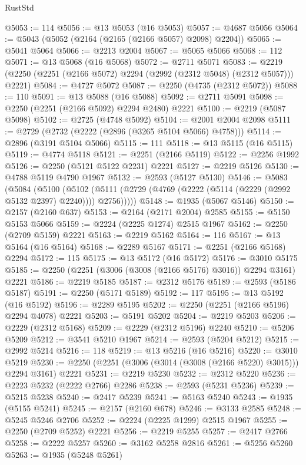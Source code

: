 \begin{lexlean}{RustStd}
\begin{coremodule}
@5053 := 114
@5056 := @13 @5053 (@16 @5053)
@5057 := @4687 @5056
@5064 := @5043 (@5052 (@2164 (@2165 (@2166 @5057) @2098) @2204))
@5065 := @5041 @5064
@5066 := @2213 @2004
@5067 := @5065 @5066
@5068 := 112
@5071 := @13 @5068 (@16 @5068)
@5072 := @2711 @5071
@5083 := @2219 (@2250 (@2251 (@2166 @5072) @2294 (@2992 (@2312 @5048) (@2312 @5057))) @2221)
@5084 := @4727 @5072
@5087 := @2250 (@4735 (@2312 @5072))
@5088 := 110
@5091 := @13 @5088 (@16 @5088)
@5092 := @2711 @5091
@5098 := @2250 (@2251 (@2166 @5092) @2294 @2480) @2221
@5100 := @2219 (@5087 @5098)
@5102 := @2725 (@4748 @5092)
@5104 := @2001 @2004 @2098
@5111 := @2729 (@2732 (@2222 (@2896 (@3265 @5104 @5066) @4758)))
@5114 := @2896 (@3191 @5104 @5066)
@5115 := 111
@5118 := @13 @5115 (@16 @5115)
@5119 := @4774 @5118
@5121 := @2251 (@2166 @5119)
@5122 := @2256 @1992
@5126 := @2250 (@5121 @5122 @2231) @2221
@5127 := @2219 @5126
@5130 := @4788 @5119 @4790 @1967
@5132 := @2593 (@5127 @5130)
@5146 := @5083
    (@5084
      (@5100
        (@5102 (@5111 (@2729 (@4769 (@2222 (@5114 (@2229 (@2992 @5132 @2397) @2240)))) @2756)))))
@5148 := @1935 (@5067 @5146)
@5150 := @2157 (@2160 @637)
@5153 := @2164 (@2171 @2004) @2585
@5155 := @5150 @5153 @5066
@5159 := @2224 (@2225 @1274) @2515 @1967
@5162 := @2250 (@2709 @5159) @2221
@5163 := @2219 @5162
@5164 := 116
@5167 := @13 @5164 (@16 @5164)
@5168 := @2289 @5167
@5171 := @2251 (@2166 @5168) @2294
@5172 := 115
@5175 := @13 @5172 (@16 @5172)
@5176 := @3010 @5175
@5185 := @2250 (@2251 (@3006 (@3008 (@2166 @5176) @3016)) @2294 @3161) @2221
@5186 := @2219 @5185
@5187 := @2312 @5176
@5189 := @2593 (@5186 @5187)
@5191 := @2250 (@5171 @5189)
@5192 := 117
@5195 := @13 @5192 (@16 @5192)
@5196 := @2289 @5195
@5202 := @2250 (@2251 (@2166 @5196) @2294 @4078) @2221
@5203 := @5191 @5202
@5204 := @2219 @5203
@5206 := @2229 (@2312 @5168)
@5209 := @2229 (@2312 @5196) @2240
@5210 := @5206 @5209
@5212 := @3541 @5210 @1967
@5214 := @2593 (@5204 @5212)
@5215 := @2992 @5214
@5216 := 118
@5219 := @13 @5216 (@16 @5216)
@5220 := @3010 @5219
@5230 := @2250 (@2251 (@3006 (@3014 (@3008 (@2166 @5220) @3015))) @2294 @3161) @2221
@5231 := @2219 @5230
@5232 := @2312 @5220
@5236 := @2223 @5232 (@2222 @2766) @2286
@5238 := @2593 (@5231 @5236)
@5239 := @5215 @5238
@5240 := @2417 @5239
@5241 := @5163 @5240
@5243 := @1935 (@5155 @5241)
@5245 := @2157 (@2160 @678)
@5246 := @3133 @2585
@5248 := @5245 @5246 @2706
@5252 := @2224 (@2225 @1299) @2515 @1967
@5255 := @2250 (@2709 @5252) @2221
@5256 := @2219 @5255
@5257 := @2417 @2766
@5258 := @2222 @5257
@5260 := @3162 @5258 @2816
@5261 := @5256 @5260
@5263 := @1935 (@5248 @5261)

\end{coremodule}
\end{lexlean}
